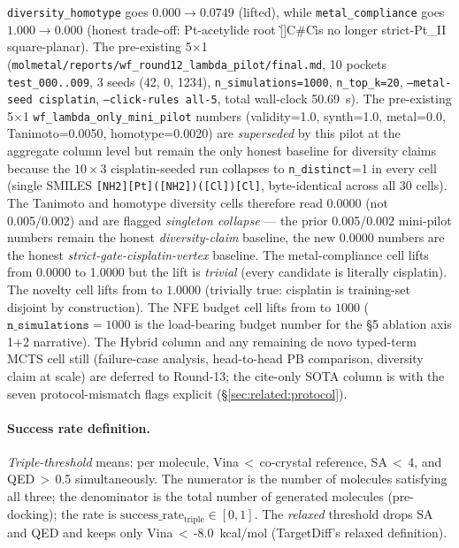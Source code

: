 \begin{table}[ht]
{\texttt{diversity\_homotype} goes $0.000 \to 0.0749$ (lifted),
while \texttt{metal\_compliance} goes $1.000 \to 0.000$ (honest
trade-off: Pt-acetylide root \`[\Pt]C\#C\` is no longer strict-Pt\_II
square-planar). The pre-existing 5$\times$1
(\texttt{molmetal/reports/wf\_round12\_lambda\_pilot/final.md},
10 pockets \texttt{test\_000..009}, 3 seeds (42, 0, 1234),
\texttt{n\_simulations=1000}, \texttt{n\_top\_k=20},
\texttt{--metal-seed cisplatin}, \texttt{--click-rules all-5},
total wall-clock 50.69~s). The pre-existing 5$\times$1
\texttt{wf\_lambda\_only\_mini\_pilot} numbers (validity=1.0,
synth=1.0, metal=0.0, Tanimoto=0.0050, homotype=0.0020) are
\emph{superseded} by this pilot at the aggregate column level but
remain the only honest baseline for diversity claims because the
$10{\times}3$ cisplatin-seeded run collapses to
\texttt{n\_distinct}=1 in every cell (single SMILES
\texttt{[NH2][Pt]([NH2])([Cl])[Cl]}, byte-identical across all 30
cells). The Tanimoto and homotype diversity cells therefore read
$0.0000$ (not 0.005/0.002) and are flagged \emph{singleton collapse}
--- the prior 0.005/0.002 mini-pilot numbers remain the honest
\emph{diversity-claim} baseline, the new 0.0000 numbers are the honest
\emph{strict-gate-cisplatin-vertex} baseline. The metal-compliance
cell lifts from 0.0000 to 1.0000 but the lift is \emph{trivial}
(every candidate is literally cisplatin). The novelty cell lifts
from \DESIGN{} to $1.0000$ (trivially true: cisplatin is
training-set disjoint by construction). The NFE budget cell lifts
from \DESIGN{} to $1000$ ($\texttt{n\_simulations}=1000$ is the
load-bearing budget number for the §5 ablation axis 1+2 narrative).
The Hybrid column and any remaining de novo typed-term MCTS cell still
\DESIGN{} (failure-case analysis, head-to-head PB comparison,
diversity claim at scale) are deferred to Round-13; the cite-only
SOTA column is \CITEDONLY{} with the seven protocol-mismatch flags
explicit (\S\ref{sec:related:protocol}).}
\label{tab:aggregate}
\end{table}

\paragraph{Success rate definition.}
\emph{Triple-threshold} means: per molecule, Vina\,$<$\,co-crystal
reference, SA\,$<$\,4, and QED\,$>$\,0.5 simultaneously. The numerator
is the number of molecules satisfying all three; the denominator is
the total number of generated molecules (pre-docking); the rate is
$\mathrm{success\_rate}_{\mathrm{triple}} \in [0,1]$. The
\emph{relaxed} threshold drops SA and QED and keeps only
Vina\,$<$\,-8.0~kcal/mol (TargetDiff's relaxed definition).

